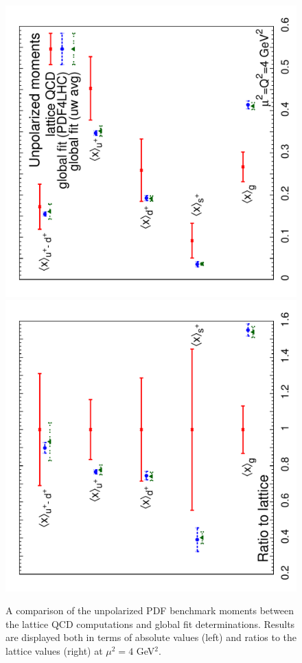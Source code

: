 \begin{figure}[!t]
\centering
\includegraphics[scale=0.44,angle=270]{plots/unpmoms}
\includegraphics[scale=0.44,angle=270]{plots/unpmomsratio}\\
\caption{\small A comparison of the unpolarized PDF benchmark moments 
between the lattice QCD computations and global fit determinations.
%
Results are displayed both in terms of absolute values (left) and ratios to
the lattice values (right) at $\mu^2=4$ GeV$^2$.}
\label{fig:Bmomsunp}
\end{figure} 


